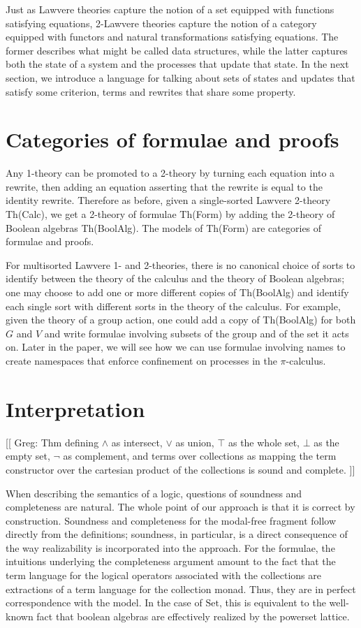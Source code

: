 \documentclass{llncs}
\newcommand{\Set}{\mathrm{Set}}
\begin{document}
Just as Lawvere theories capture the notion of a set equipped with functions satisfying equations, 2-Lawvere theories capture the notion of a category equipped with functors and natural transformations satisfying equations.  The former describes what might be called data structures, while the latter captures both the state of a system and the processes that update that state.  In the next section, we introduce a language for talking about sets of states and updates that satisfy some criterion, terms and rewrites that share some property.

\section{Categories of formulae and proofs}

Any 1-theory can be promoted to a 2-theory by turning each equation into a rewrite, then adding an equation asserting that the rewrite is equal to the identity rewrite.  Therefore as before, given a single-sorted Lawvere 2-theory Th(Calc), we get a 2-theory of formulae Th(Form) by adding the 2-theory of Boolean algebras Th(BoolAlg).  The models of Th(Form) are categories of formulae and proofs.

For multisorted Lawvere 1- and 2-theories, there is no canonical choice of sorts to identify between the theory of the calculus and the theory of Boolean algebras; one may choose to add one or more different copies of Th(BoolAlg) and identify each single sort with different sorts in the theory of the calculus.  For example, given the theory of a group action, one could add a copy of Th(BoolAlg) for both $G$ and $V$ and write formulae involving subsets of the group and of the set it acts on.  Later in the paper, we will see how we can use formulae involving names to create namespaces that enforce confinement on processes in the $\pi$-calculus.

\section{Interpretation}

[[ Greg: Thm defining $\land$ as intersect, $\lor$ as union, $\top$ as
    the whole set, $\bot$ as the empty set, $\neg$ as complement, and
    terms over collections as mapping the term constructor over the
    cartesian product of the collections is sound and complete. ]]

When describing the semantics of a logic, questions of soundness and
completeness are natural.  The whole point of our approach is that it
is correct by construction.  Soundness and completeness for the
modal-free fragment follow directly from the definitions; soundness,
in particular, is a direct consequence of the way realizability is
incorporated into the approach.  For the formulae, the intuitions
underlying the completeness argument amount to the fact that the term
language for the logical operators associated with the collections are
extractions of a term language for the collection monad.  Thus, they
are in perfect correspondence with the model.  In the case of $\Set$,
this is equivalent to the well-known fact that boolean algebras are
effectively realized by the powerset lattice.
\end{document}
